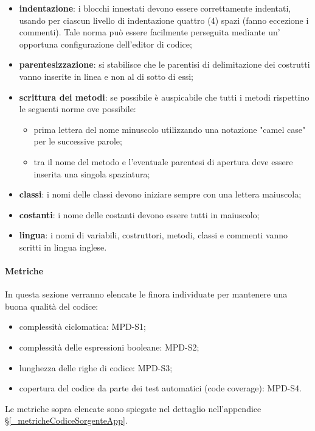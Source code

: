 \begin{itemize}
  \item \textbf{indentazione}: i blocchi innestati devono essere correttamente indentati, usando per ciascun livello di indentazione quattro (4) spazi (fanno eccezione i commenti).  Tale norma può essere facilmente perseguita mediante un' opportuna configurazione dell'editor di codice;
  \item \textbf{parentesizzazione}: si stabilisce che le parentisi di delimitazione dei costrutti vanno inserite in linea e non al di sotto di essi;
  \item \textbf{scrittura dei metodi}: se possibile è auspicabile che tutti i metodi rispettino le seguenti norme ove possibile:
        \begin{itemize}
          \item prima lettera del nome minuscolo utilizzando una notazione "camel case" per le successive parole;
          \item tra il nome del metodo e l'eventuale parentesi di apertura deve essere inserita una singola spaziatura;
        \end{itemize}
  \item \textbf{classi}: i nomi delle classi devono iniziare sempre con una lettera maiuscola;
  \item \textbf{costanti}: i nome delle costanti devono essere tutti in maiuscolo;
  \item \textbf{lingua}: i nomi di variabili, costruttori, metodi, classi e commenti vanno scritti in lingua inglese.
\end{itemize}

\paragraph{Metriche}
\label{_metricheQualitaCodice}
In questa sezione verranno elencate le  finora individuate per mantenere una buona qualità del codice:
\begin{itemize}
  \item complessità ciclomatica: MPD-S1;
  \item complessità delle espressioni booleane: MPD-S2;
  \item lunghezza delle righe di codice: MPD-S3;
  \item copertura del codice da parte dei test automatici (code coverage): MPD-S4.
\end{itemize}

Le metriche sopra elencate sono spiegate nel dettaglio nell'appendice \S\ref{_metricheCodiceSorgenteApp}.
